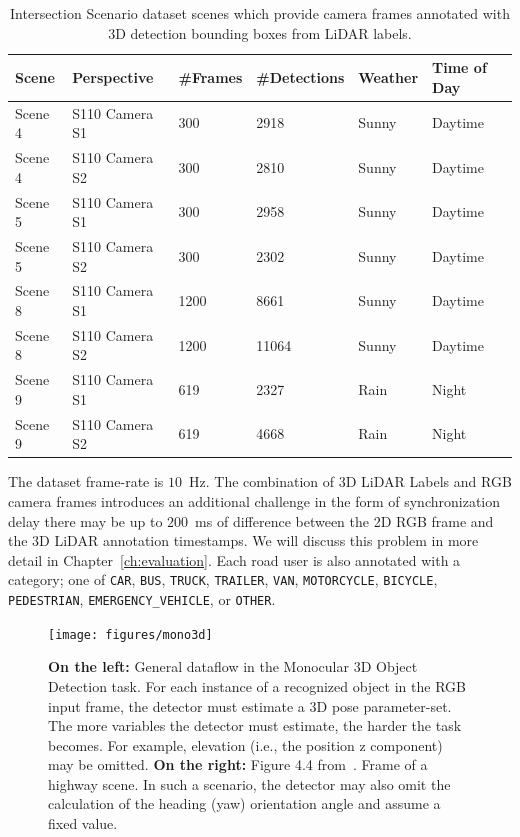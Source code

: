 \begin{table}[h]
    \centering
    \caption{Intersection Scenario dataset scenes which provide camera frames annotated with 3D detection bounding boxes from LiDAR labels.}
    \label{tab:a9r1}
    \begin{tabular}{llllll}
        \toprule
        Scene & Perspective & \#Frames & \#Detections & Weather & Time of Day \\
        \midrule
        Scene 4 & S110 Camera S1 & 300 & 2918 & Sunny & Daytime \\
        Scene 4 & S110 Camera S2 & 300 & 2810 & Sunny & Daytime \\
        \midrule
        Scene 5 & S110 Camera S1 & 300 & 2958 & Sunny & Daytime \\
        Scene 5 & S110 Camera S2 & 300 & 2302 & Sunny & Daytime \\
        \midrule
        Scene 8 & S110 Camera S1 & 1200 & 8661 & Sunny & Daytime \\
        Scene 8 & S110 Camera S2 & 1200 & 11064 & Sunny & Daytime \\
        \midrule
        Scene 9 & S110 Camera S1 & 619 & 2327 & Rain & Night \\
        Scene 9 & S110 Camera S2 & 619 & 4668 & Rain & Night \\
        \bottomrule
    \end{tabular}
\end{table}

The dataset frame-rate is $10$~Hz. The combination of 3D LiDAR Labels and RGB camera frames introduces an additional challenge in the form of synchronization delay \textemdash there may be up to $200$~ms of difference between the 2D RGB frame and the 3D LiDAR annotation timestamps.
We will discuss this problem in more detail in Chapter~\ref{ch:evaluation}.
Each road user is also annotated with a category; one of \texttt{CAR}, \texttt{BUS}, \texttt{TRUCK}, \texttt{TRAILER}, \texttt{VAN}, \texttt{MOTORCYCLE}, \texttt{BICYCLE}, \texttt{PEDESTRIAN}, \texttt{EMERGENCY\_VEHICLE}, or \texttt{OTHER}.


\begin{figure}[htb]
    \texttt{[image: figures/mono3d]}
    \caption{\textbf{On the left:} General dataflow in the Monocular 3D Object Detection task. For each instance of a recognized object in the RGB input frame, the detector must estimate a 3D pose parameter-set. The more variables the detector must estimate, the harder the task becomes. For example, elevation (i.e., the position z component) may be omitted. \textbf{On the right:} Figure 4.4 from~\cite{leonthesis}. Frame of a highway scene. In such a scenario, the detector may also omit the calculation of the heading (yaw) orientation angle and assume a fixed value.}
    \label{fig:mono3d-task-overview}
\end{figure}

